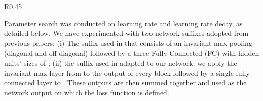 \documentclass{article}
\begin{document}
\begin{wraptable}[13]{R}{0.45\textwidth} \vspace*{-5pt}
\caption{Regression, the QM9 dataset.}\label{tab:regression}
  \centering
  \label{tab:reg_res}\end{wraptable}
Parameter search was conducted on learning rate and learning rate decay, as detailed below.  
We have experimented with two network suffixes adopted from previous papers: (i) The suffix used in \cite{maron2018invariant} that consists of an invariant max pooling (diagonal and off-diagonal) followed by a three Fully Connected (FC) with hidden units' sizes of ;  (ii) the suffix used in \cite{xu2018how} adapted to our network: we apply the invariant max layer from \cite{maron2018invariant} to the output of every block followed by a single fully connected layer to . These outputs are then summed together and used as the network output on which the loss function is defined.
\end{document}
